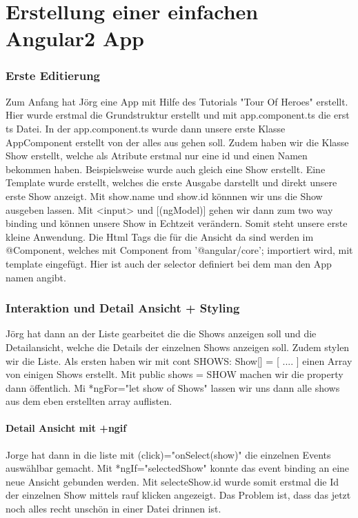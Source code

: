 \documentclass[12pt,titlepage]{article}
\begin{document}
\newpage
\part{Erstellung einer einfachen Angular2 App}
\section{Erste Editierung}
Zum Anfang hat Jörg eine App mit Hilfe des Tutorials "Tour Of Heroes" erstellt. Hier wurde erstmal die Grundstruktur erstellt und mit app.component.ts die erst ts Datei. In der app.component.ts wurde dann unsere erste Klasse AppComponent erstellt von der alles aus gehen soll. Zudem haben wir die Klasse Show erstellt, welche als Atribute erstmal nur eine id und einen Namen bekommen haben. Beispielsweise wurde auch gleich eine Show erstellt. Eine Template wurde erstellt, welches die erste Ausgabe darstellt und direkt unsere erste Show anzeigt. Mit {{show.name}} und {{show.id}} könnnen wir uns die Show ausgeben lassen. Mit <input> und [(ngModel)] gehen wir dann zum two way binding und können unsere Show in Echtzeit verändern. Somit steht unsere erste kleine Anwendung. Die Html Tags die für die Ansicht da sind werden im @Component, welches mit {Component} from '@angular/core'; importiert wird, mit template eingefügt.  Hier ist auch der selector definiert bei dem man den App namen angibt.

\section{Interaktion und Detail Ansicht + Styling}
Jörg hat dann an der Liste gearbeitet die die Shows anzeigen soll und die Detailansicht, welche die Details der einzelnen Shows anzeigen soll. Zudem stylen wir die Liste. Als ersten haben wir mit cont SHOWS: Show[] = [{ .... }] einen Array von einigen Shows erstellt. Mit public shows = SHOW machen wir die property dann öffentlich. Mi *ngFor="let show of Shows" lassen wir uns dann alle shows aus dem eben erstellten array auflisten. 

\subsection{Detail Ansicht mit +ngif}
Jorge hat dann in die liste mit (click)="onSelect(show)" die einzelnen Events auswählbar gemacht. Mit *ngIf="selectedShow" konnte das event binding an eine neue Ansicht gebunden werden. Mit {{selecteShow.id}} wurde somit erstmal die Id der einzelnen Show mittels rauf klicken angezeigt. Das Problem ist, dass das jetzt noch alles recht unschön in einer Datei drinnen ist.
\end{document}
